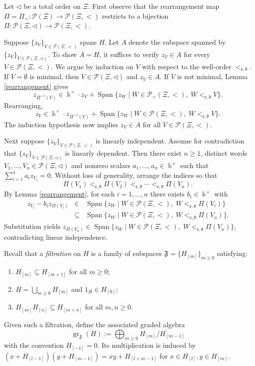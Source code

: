 \documentclass{article}
\makeatletter
\renewenvironment{proof}[1][\proofname]{\par
	\pushQED{\qed}%
	\normalfont \topsep6\p@\@plus6\p@\relax
	\trivlist
	\item[\hskip\labelsep
	\bfseries
	#1\@addpunct{.}]\ignorespaces
}{%
	\popQED\endtrivlist\@endpefalse
}
\theoremstyle{plain}
\theoremstyle{definition}
\numberwithin{equation}{section}
\DeclareMathOperator{\gr}{gr}
\DeclareMathOperator{\Span}{Span}
\newcommand{\PP}{\mathcal{P}}
\newcommand{\dd}{\mathfrak{d}}
\newcommand{\rr}{\mathfrak{r}}
\makeatother
\begin{document}
	\begin{proof}
		Let $\triangleleft$ be a total order on $\Xi$. First observe that the rearrangement map $\Pi = \Pi_{<}\colon \PP(\Xi) \to \PP(\Xi, <)$ restricts to a bijection $\Pi\colon \PP(\Xi, \triangleleft) \to \PP(\Xi, <)$.
		
		Suppose $\{z_V\}_{V\in \PP(\Xi,<)}$ spans $H$. Let $A$ denote the subspace spanned by $\{z_V\}_{V\in \PP(\Xi,\triangleleft)}$. To show $A=H$, it suffices to verify $z_V\in A$ for every $V\in {\PP(\Xi,<)}$. We argue by induction on $V$ with respect to the well-order $<_{\rr,\dd}$. If $V=\emptyset$ is minimal, then $V\in \PP(\Xi,\triangleleft)$ and $z_{V} \in A$. If $V$ is not minimal, Lemma \ref{rearrangement} gives
		$$z_{\Pi^{-1}(V)} \in \Bbbk^{\times}\cdot z_{V} + \Span\{z_{W}\mid W\in\PP_{+}(\Xi,<),\; W<_{\rr,\dd} V\}.$$
		Rearranging,
		$$
		z_V \in \Bbbk^{\times}\cdot z_{\Pi^{-1}(V)} + \Span\{z_W\mid W \in \PP(\Xi,<),\; W <_{\rr,\dd} V \}.
		$$
		The induction hypothesis now implies $z_{V}\in A$ for all $V\in {\PP(\Xi,<)}$.
		
		Next suppose $\{z_V\}_{V\in\PP(\Xi,<)}$ is linearly independent. Assume for contradiction that $\{z_V\}_{V\in \PP(\Xi,\triangleleft)}$ is linearly dependent. Then there exist $n\geq 1$, distinct words $V_1,\dots,V_n \in \PP(\Xi,\triangleleft)$ and nonzero scalars $a_1,\dots,a_n \in \Bbbk^{\times}$ such that $\sum_{i=1}^{n}a_i z_{V_i}=0$. Without loss of generality, arrange the indices so that
		$$\Pi(V_1)<_{\rr,\dd}\Pi(V_2)<_{\rr,\dd} \cdots <_{\rr,\dd}\Pi(V_n).$$
		By Lemma \ref{rearrangement}, for each $i=1,\ldots, n$ there exists $b_{i}\in \Bbbk^{\times}$ with
		\begin{eqnarray*}
			z_{V_{i}} - b_{i} z_{\Pi(V_{i})} &\in& \Span\{z_W\mid W \in \PP(\Xi,<),\; W <_{\rr,\dd} \Pi(V_{i}) \} \\
			&\subseteq& \Span\{z_W\mid W \in \PP(\Xi,<),\; W <_{\rr,\dd} \Pi(V_{n}) \}.
		\end{eqnarray*}
		Substitution yields $z_{\Pi(V_n)}\in \Span\{ z_W\mid W\in\PP(\Xi,<),\; W <_{\rr,\dd} \Pi(V_n) \}$, contradicting linear independence.
	\end{proof}
	
	Recall that a \emph{filtration} on $H$ is a family of subspaces $\mathfrak{F}=\{H_{[m]}\}_{m\geq 0}$ satisfying:
	\begin{enumerate}
		\item $H_{[m]} \subseteq H_{[m+1]}$ for all $m\geq 0$;
		\item $H=\bigcup_{m\geq 0}H_{[m]}$ and $1_{H}\in H_{[0]}$;
		\item $H_{[m]} H_{[n]}\subseteq H_{[m+n]}$ for all $m,n\geq 0$.
	\end{enumerate}
	Given such a filtration, define the associated graded algebra
	$$\gr_{\mathfrak{F}}(H):=\bigoplus_{m\geq 0} H_{[m]}/H_{[m-1]}$$ with the convention $H_{[-1]}=0$. 
	Its multiplication is induced by $(x+H_{[l-1]})(y+H_{[m-1]}) =xy+H_{[l+m-1]}$ for $x\in H_{[l]}, y\in H_{[m]}$.
	
\end{document}
